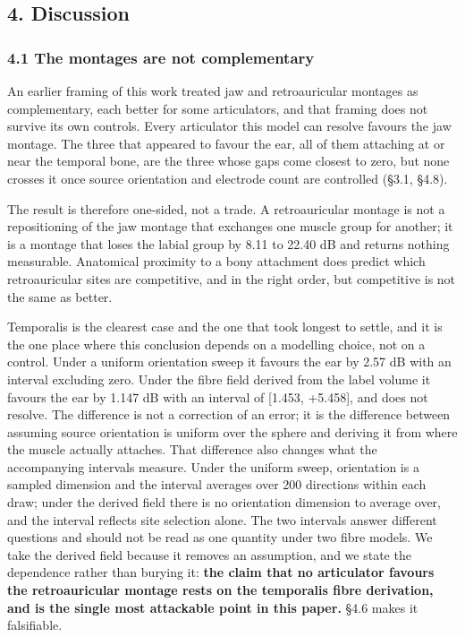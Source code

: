 \documentclass[
  11pt,
  a4paper,
]{article}
\newcounter{none} %
\begin{document}
\subsection{4. Discussion}\label{discussion}

\subsubsection{4.1 The montages are not complementary}\label{the-montages-are-not-complementary}

An earlier framing of this work treated jaw and retroauricular montages as
complementary, each better for some articulators, and that framing does not
survive its own controls. Every articulator this model can resolve favours the
jaw montage. The three that appeared to favour the ear, all of them attaching at
or near the temporal bone, are the three whose gaps come closest to zero, but
none crosses it once source orientation and electrode count are controlled
(\S{}3.1, \S{}4.8).

The result is therefore one-sided, not a trade. A retroauricular montage
is not a repositioning of the jaw montage that exchanges one muscle group for
another; it is a montage that loses the labial group by 8.11 to 22.40 dB and
returns nothing measurable. Anatomical proximity to a bony attachment does
predict which retroauricular sites are competitive, and in the right order, but
competitive is not the same as better.

Temporalis is the clearest case and the one that took longest to settle, and it
is the one place where this conclusion depends on a modelling choice, not on a
control. Under a uniform orientation sweep it favours the ear by 2.57 dB with an
interval excluding zero. Under the fibre field derived from the label volume it
favours the ear by 1.147 dB with an interval of {[}\textminus{}1.453, +5.458{]}, and does not
resolve. The difference is not a correction of an error; it is the difference
between assuming source orientation is uniform over the sphere and deriving it
from where the muscle actually attaches. That difference also changes what the
accompanying intervals measure. Under the uniform sweep, orientation is a
sampled dimension and the interval averages over 200 directions within each
draw; under the derived field there is no orientation dimension to average over,
and the interval reflects site selection alone. The two intervals answer
different questions and should not be read as one quantity under two fibre
models. We take the derived field because it removes an assumption, and we state
the dependence rather than burying it: \textbf{the claim that no articulator favours
the retroauricular montage rests on the temporalis fibre derivation, and is the
single most attackable point in this paper.} \S{}4.6 makes it falsifiable.
\end{document}
